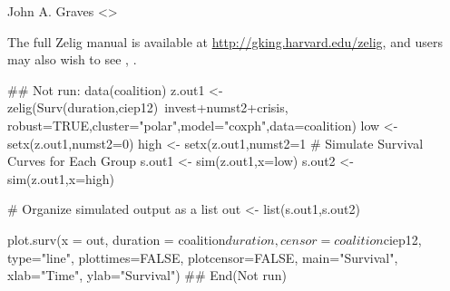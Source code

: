 \begin{Author}\relax
John A. Graves <>
\end{Author}
\begin{SeeAlso}\relax
The full Zelig manual is available at
\url{http://gking.harvard.edu/zelig}, and users may also wish to see
, .
\end{SeeAlso}
\begin{Examples}
\begin{ExampleCode}## Not run: 
data(coalition)
z.out1 <- zelig(Surv(duration,ciep12)~invest+numst2+crisis,
robust=TRUE,cluster="polar",model="coxph",data=coalition)
low <- setx(z.out1,numst2=0)
high <- setx(z.out1,numst2=1
# Simulate Survival Curves for Each Group
s.out1 <- sim(z.out1,x=low) 
s.out2 <- sim(z.out1,x=high)

# Organize simulated output as a list
out <- list(s.out1,s.out2)

plot.surv(x = out, duration = coalition$duration, censor=coalition$ciep12,
          type="line", plottimes=FALSE, plotcensor=FALSE,
          main="Survival", xlab="Time", ylab="Survival")
## End(Not run)
\end{ExampleCode}
\end{Examples}


